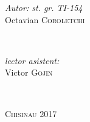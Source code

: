 \begin{titlepage}
\begin{center}
      \begin{minipage}{0.4\textwidth}
      \begin{flushleft} \large
      \emph{Autor: st. gr. TI-154}\\
      Octavian \textsc{Coroletchi}
      \end{flushleft}
      \end{minipage}
      ~
      \begin{minipage}{0.4\textwidth}
      \begin{flushright} \large
      \emph{lector asistent:} \\
      Victor \textsc{Gojin} \\ %
      \end{flushright}
      \end{minipage}\\[70mm]
	\vfill \vfill \vfill \vfill 

      \textsc{Chisinau 2017}

      \vfill %
      \end{center}
      
\end{titlepage}